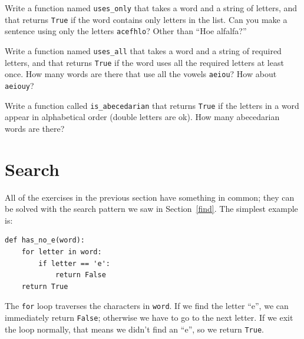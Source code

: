 \documentclass[10pt]{book}
\begin{document}
\begin{exercise}

Write a function named \verb"uses_only" that takes a word and a
string of letters, and that returns {\tt True} if the word contains
only letters in the list.  Can you make a sentence using only the
letters {\tt acefhlo}?  Other than ``Hoe alfalfa?''

\end{exercise}


\begin{exercise} 

Write a function named \verb"uses_all" that takes a word and a
string of required letters, and that returns {\tt True} if the word
uses all the required letters at least once.  How many words are there
that use all the vowels {\tt aeiou}?  How about {\tt aeiouy}?

\end{exercise}


\begin{exercise}

Write a function called \verb"is_abecedarian" that returns
{\tt True} if the letters in a word appear in alphabetical order
(double letters are ok).  
How many abecedarian words are there?


\end{exercise}






\section{Search}

All of the exercises in the previous section have something
in common; they can be solved with the search pattern we saw
in Section~\ref{find}.  The simplest example is:

\begin{verbatim}
def has_no_e(word):
    for letter in word:
        if letter == 'e':
            return False
    return True
\end{verbatim}
%
The {\tt for} loop traverses the characters in {\tt word}.  If we find
the letter ``e'', we can immediately return {\tt False}; otherwise we
have to go to the next letter.  If we exit the loop normally, that
means we didn't find an ``e'', so we return {\tt True}.
\end{document}
